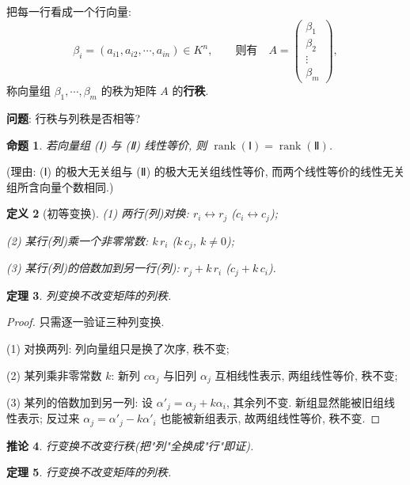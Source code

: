 \documentclass[UTF8,11pt]{ctexart}
\theoremstyle{cnthm}
\newtheorem{thm}{定理}[section]
\newtheorem{prop}[thm]{命题}
\newtheorem{cor}[thm]{推论}
\newtheorem{defn}[thm]{定义}
\begin{document}
把每一行看成一个行向量:
\[
\beta_i=(a_{i1},a_{i2},\cdots,a_{in})\in K^n,
\qquad\text{则有}\quad A=\begin{pmatrix}\beta_1\\\beta_2\\\vdots\\\beta_m\end{pmatrix},
\]
称向量组 $\beta_1,\cdots,\beta_m$ 的秩为矩阵 $A$ 的\textbf{行秩}.

\textbf{问题}: 行秩与列秩是否相等?

\begin{prop}
若向量组 (Ⅰ) 与 (Ⅱ) 线性等价, 则 $\operatorname{rank}(\text{Ⅰ})=\operatorname{rank}(\text{Ⅱ})$.
\end{prop}

(理由: (Ⅰ) 的极大无关组与 (Ⅱ) 的极大无关组线性等价, 而两个线性等价的线性无关组所含向量个数相同.)

\begin{defn}[初等变换]
(1) 两行(列)对换: $r_i\leftrightarrow r_j$ ($c_i\leftrightarrow c_j$);

(2) 某行(列)乘一个非零常数: $k\,r_i$ ($k\,c_j$, $k\neq0$);

(3) 某行(列)的倍数加到另一行(列): $r_j+k\,r_i$ ($c_j+k\,c_i$).
\end{defn}

\begin{thm}
列变换不改变矩阵的列秩.
\end{thm}

\begin{proof}
只需逐一验证三种列变换.

(1) 对换两列: 列向量组只是换了次序, 秩不变;

(2) 某列乘非零常数 $k$: 新列 $c\alpha_j$ 与旧列 $\alpha_j$ 互相线性表示, 两组线性等价, 秩不变;

(3) 某列的倍数加到另一列: 设 $\alpha'_j=\alpha_j+k\alpha_i$, 其余列不变. 新组显然能被旧组线性表示; 反过来 $\alpha_j=\alpha'_j-k\alpha'_i$ 也能被新组表示, 故两组线性等价, 秩不变.
\end{proof}

\begin{cor}
行变换不改变行秩(把"列"全换成"行"即证).
\end{cor}

\begin{thm}
行变换不改变矩阵的列秩.
\end{thm}
\end{document}
